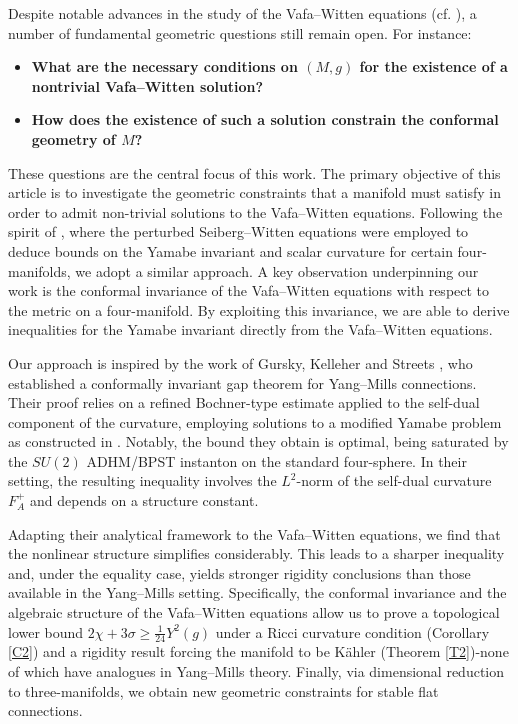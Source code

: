 \documentclass[12pt, twoside]{article}
\theoremstyle{definition}
\numberwithin{equation}{section}
\begin{document}
Despite notable advances in the study of the Vafa--Witten equations (cf. \cite{Che24,DG22,Gua23,Hua19,Hua22,Mar10,Tan15,Tan17}), a number of fundamental geometric questions still remain open. For instance:
\begin{itemize}
	\item[(i)] \textbf{What are the necessary conditions on $(M,g)$ for the existence of a nontrivial Vafa--Witten solution?}
	\item[(ii)]\textbf{How does the existence of such a solution constrain the conformal geometry of $M$?}
\end{itemize}
These questions are the central focus of this work. The primary objective of this article is to investigate the geometric constraints that a manifold    must satisfy in order to admit non-trivial solutions to the Vafa--Witten equations. Following the spirit of \cite{LeB97}, where the perturbed Seiberg--Witten equations were employed to deduce bounds on the Yamabe invariant and scalar curvature for certain four-manifolds, we adopt a similar approach. A key observation underpinning our work is the conformal invariance of the Vafa--Witten equations with respect to the metric on a four-manifold. By exploiting this invariance, we are able to derive inequalities for the Yamabe invariant directly from the Vafa--Witten equations. 

 
Our approach is inspired by the work of Gursky, Kelleher and Streets \cite{GKS18}, who established a conformally invariant gap theorem for Yang--Mills connections. Their proof relies on a refined Bochner-type estimate applied to the self-dual component of the curvature, employing solutions to a modified Yamabe problem as constructed in \cite{Gur00,GL98}.  Notably, the bound they obtain is optimal, being saturated by the $SU(2)$ ADHM/BPST instanton on the standard four-sphere. In their setting, the resulting inequality involves the $L^{2}$-norm of the self-dual curvature $F_{A}^{+}$ and depends on a structure constant. 

Adapting their analytical framework to the Vafa--Witten equations, we find that the nonlinear structure simplifies considerably. This leads to a sharper inequality and, under the equality case, yields stronger rigidity conclusions than those available in the Yang--Mills setting. Specifically, the conformal invariance and the algebraic structure of the Vafa--Witten equations allow us to prove a topological lower bound  $2\chi+3\sigma\geq\frac{1}{24}Y^{2}(g)$ under a Ricci curvature condition (Corollary \ref{C2}) and a rigidity result forcing the manifold to be Kähler (Theorem \ref{T2})-none of which have analogues in Yang--Mills theory. Finally, via dimensional reduction to three-manifolds, we obtain new geometric constraints for stable flat connections.
\end{document}
